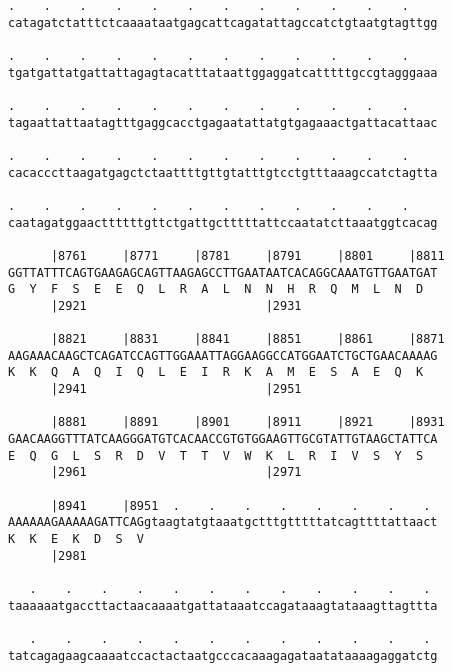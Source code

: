 \documentclass{article}
\begin{document}
\begin{Verbatim}
.    .    .    .    .    .    .    .    .    .    .    .    
catagatctatttctcaaaataatgagcattcagatattagccatctgtaatgtagttgg
                                                            
.    .    .    .    .    .    .    .    .    .    .    .    
tgatgattatgattattagagtacatttataattggaggatcatttttgccgtagggaaa
                                                            
.    .    .    .    .    .    .    .    .    .    .    .    
tagaattattaatagtttgaggcacctgagaatattatgtgagaaactgattacattaac
                                                            
.    .    .    .    .    .    .    .    .    .    .    .    
cacacccttaagatgagctctaattttgttgtatttgtcctgtttaaagccatctagtta
                                                            
.    .    .    .    .    .    .    .    .    .    .    .    
caatagatggaacttttttgttctgattgctttttattccaatatcttaaatggtcacag
                                                            
      |8761     |8771     |8781     |8791     |8801     |8811
GGTTATTTCAGTGAAGAGCAGTTAAGAGCCTTGAATAATCACAGGCAAATGTTGAATGAT
G  Y  F  S  E  E  Q  L  R  A  L  N  N  H  R  Q  M  L  N  D  
      |2921                         |2931                   
  
      |8821     |8831     |8841     |8851     |8861     |8871
AAGAAACAAGCTCAGATCCAGTTGGAAATTAGGAAGGCCATGGAATCTGCTGAACAAAAG
K  K  Q  A  Q  I  Q  L  E  I  R  K  A  M  E  S  A  E  Q  K  
      |2941                         |2951                   
  
      |8881     |8891     |8901     |8911     |8921     |8931
GAACAAGGTTTATCAAGGGATGTCACAACCGTGTGGAAGTTGCGTATTGTAAGCTATTCA
E  Q  G  L  S  R  D  V  T  T  V  W  K  L  R  I  V  S  Y  S  
      |2961                         |2971                   
  
      |8941     |8951  .    .    .    .    .    .    .    . 
AAAAAAGAAAAAGATTCAGgtaagtatgtaaatgctttgtttttatcagttttattaact
K  K  E  K  D  S  V                                         
      |2981                                                 
  
   .    .    .    .    .    .    .    .    .    .    .    . 
taaaaaatgaccttactaacaaaatgattataaatccagataaagtataaagttagttta
                                                            
   .    .    .    .    .    .    .    .    .    .    .    . 
tatcagagaagcaaaatccactactaatgcccacaaagagataatataaaagaggatctg
                                                            

\end{Verbatim}
\end{document}
